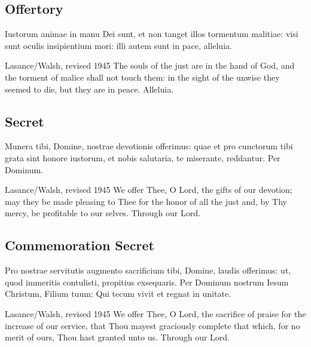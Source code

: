 \subsection{Offertory}
\label{proper-offertory}
\begin{latinproper}
Iustorum animae in manu Dei sunt, et non tanget illos tormentum malitiae: visi sunt oculis insipientium mori: illi autem sunt in pace, alleluia.
\end{latinproper}
\begin{englishwitness}{Lasance/Walsh, revised 1945}
The souls of the just are in the hand of God, and the torment of malice shall not touch them: in the sight of the unwise they seemed to die, but they are in peace. Alleluia.
\end{englishwitness}

\subsection{Secret}
\label{proper-secret}
\begin{latinproper}
Munera tibi, Domine, nostrae devotionis offerimus: quae et pro cunctorum tibi grata sint honore iustorum, et nobis salutaria, te miserante, reddantur. Per Dominum.
\end{latinproper}
\begin{englishwitness}{Lasance/Walsh, revised 1945}
We offer Thee, O Lord, the gifts of our devotion; may they be made pleasing to Thee for the honor of all the just and, by Thy mercy, be profitable to our selves. Through our Lord.
\end{englishwitness}

\subsection{Commemoration Secret}
\label{proper-commemoration-secret}
\begin{latinproper}
Pro nostrae servitutis augmento sacrificium tibi, Domine, laudis offerimus: ut, quod immeritis contulisti, propitius exsequaris. Per Dominum nostrum Iesum Christum, Filium tuum: Qui tecum vivit et regnat in unitate.
\end{latinproper}
\begin{englishwitness}{Lasance/Walsh, revised 1945}
We offer Thee, O Lord, the sacrifice of praise for the increase of our service, that Thou mayest graciously complete that which, for no merit of ours, Thou hast granted unto us. Through our Lord.
\end{englishwitness}

